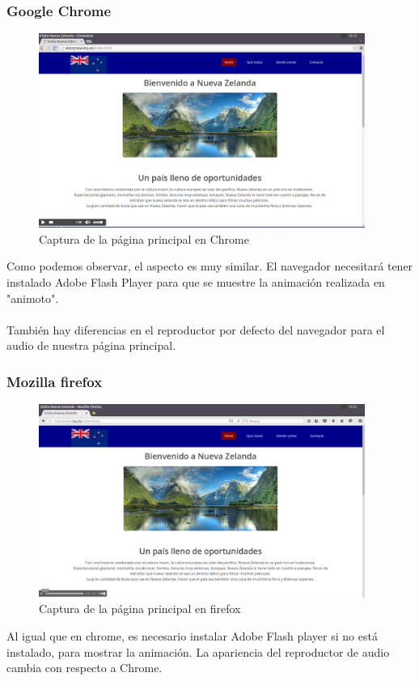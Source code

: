 \subsubsection{Google Chrome}
\begin{figure}[h]
	\centering
	\includegraphics[width=0.95\textwidth]{./Fotos/chrome-capture.png}
	\caption{Captura de la página principal en Chrome}
	\label{fig: ejemplo}
\end{figure}
Como podemos observar, el aspecto es muy similar. El navegador necesitará tener instalado Adobe Flash Player para que se muestre la animación realizada en "animoto". \\ \\ También hay diferencias en el reproductor por defecto del navegador para el audio de nuestra página principal.
\subsubsection{Mozilla firefox}
\begin{figure}[h]
	\centering
	\includegraphics[width=0.95\textwidth]{./Fotos/firefox-capture.png}
	\caption{Captura de la página principal en firefox}
	\label{fig: ejemplo}
\end{figure}
Al igual que en chrome, es necesario instalar Adobe Flash player si no está instalado, para mostrar la animación. La apariencia del reproductor de audio cambia con respecto a Chrome.
